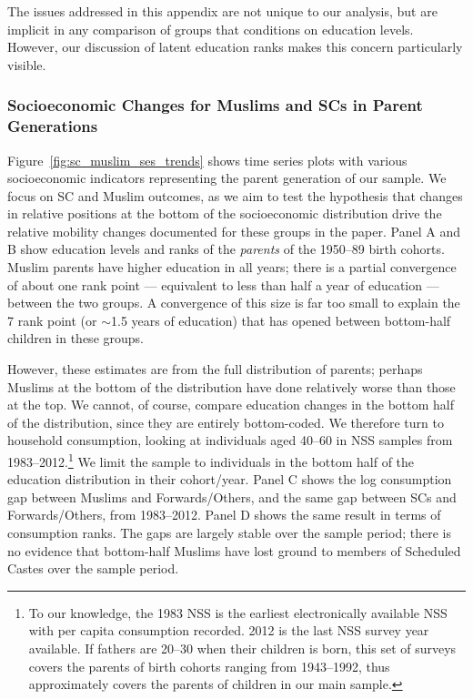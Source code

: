 The issues addressed in this appendix are not unique to our analysis, but are implicit in any comparison of groups that conditions on education levels. However, our discussion of latent education ranks makes this concern particularly visible.

\subsubsection{Socioeconomic Changes for Muslims and SCs in Parent Generations}
\label{sec:muslim_sc_other_diffs}

Figure~\ref{fig:sc_muslim_ses_trends} shows time series plots with various socioeconomic indicators representing the parent generation of our sample. We focus on SC and Muslim outcomes, as we aim to test the hypothesis that changes in relative positions at the bottom of the socioeconomic distribution drive the relative mobility changes documented for these groups in the paper. Panel A and B show education levels and ranks of the \textit{parents} of the 1950--89 birth cohorts. Muslim parents have higher education in all years; there is a partial convergence of about one rank point --- equivalent to less than half a year of education --- between the two groups. A convergence of this size is far too small to explain the 7 rank point (or $\sim$1.5 years of education) that has opened between bottom-half children in these groups.

However, these estimates are from the full distribution of parents; perhaps Muslims at the bottom of the distribution have done relatively worse than those at the top. We cannot, of course, compare education changes in the bottom half of the distribution, since they are entirely bottom-coded. We therefore turn to household consumption, looking at individuals aged 40--60 in NSS samples from 1983--2012.\footnote{To our knowledge, the 1983 NSS is the earliest electronically available NSS with per capita consumption recorded. 2012 is the last NSS survey year available. If fathers are 20--30 when their children is born, this set of surveys covers the parents of birth cohorts ranging from 1943--1992, thus approximately covers the parents of children in our main sample.} We limit the sample to individuals in the bottom half of the education distribution in their cohort/year. Panel C shows the log consumption gap between Muslims and Forwards/Others, and the same gap between SCs and Forwards/Others, from 1983--2012. Panel D shows the same result in terms of consumption ranks. The gaps are largely stable over the sample period; there is no evidence that bottom-half Muslims have lost ground to members of Scheduled Castes over the sample period.


